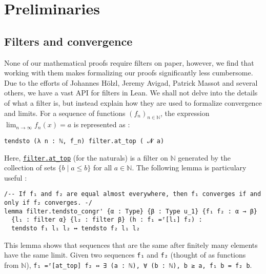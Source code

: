 \documentclass[a4paper,UKenglish,cleveref, autoref, thm-restate,pdfa]{lipics-v2021}
\newcommand{\lean}[1]{\texttt{#1}\xspace} %
\begin{document}
\section{Preliminaries}
\label{section2}
\subsection{Filters and convergence}
None of our mathematical proofs require filters on paper, however, we find that working with them makes 
formalizing our proofs significantly less cumbersome. Due to the efforts of 
Johannes Hölzl, Jeremy Avigad, Patrick Massot and several others, we have a vast API for filters in Lean. 
We shall not delve into the details of what a filter is, but instead explain how they are used to formalize convergence and limits. 
\newline For a sequence of functions $(f_n)_{n \in \mathbb{N}}$, the expression $\lim_{n \to \infty} f_n(x) = a$ is 
represented as :
\begin{lstlisting}
tendsto (λ n : ℕ, f_n) filter.at_top ( 𝓝 a)
\end{lstlisting}
Here, \href{https://leanprover-community.github.io/mathlib_docs/order/filter/at_top_bot.html#filter.at_top}{\lean{filter.at\_top}} 
(for the naturals) is a filter on $\mathbb{N}$ generated by the collection of sets $\{ b \mid a \leq b \}$ 
for all $a \in \mathbb{N}$. %
The following lemma is particulary useful :
\begin{lstlisting}
/-- If f₁ and f₂ are equal almost everywhere, then f₁ converges if and only if f₂ converges. -/
lemma filter.tendsto_congr' {α : Type} {β : Type u_1} {f₁ f₂ : α → β} 
  {l₁ : filter α} {l₂ : filter β} (h : f₁ =ᶠ[l₁] f₂) : 
  tendsto f₁ l₁ l₂ ↔ tendsto f₂ l₁ l₂
\end{lstlisting}
This lemma shows that sequences that are the same after finitely many 
elements have the same limit. 
Given two sequences \lean{f₁} and \lean{f₂} (thought of as functions from $\mathbb{N}$), \newline \lean{f₁ =ᶠ[at\_top] f₂ ↔ ∃ (a : ℕ), ∀ (b : ℕ), b ≥ a, f₁ b = f₂ b}. 
\end{document}
